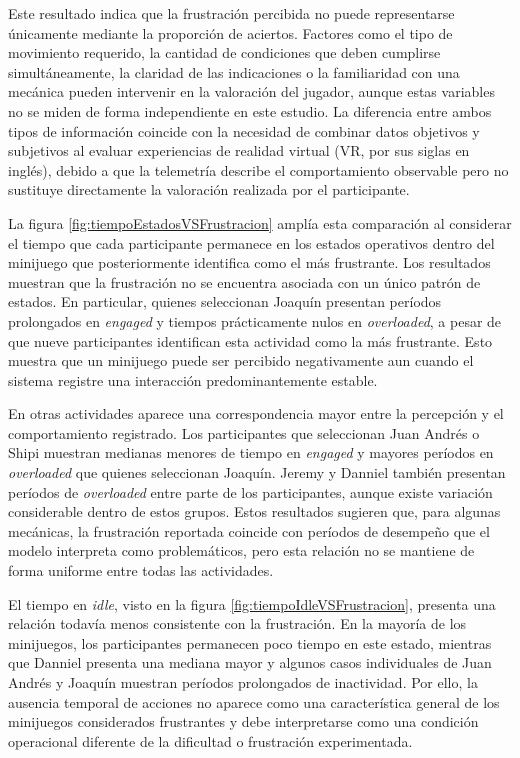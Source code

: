 Este resultado indica que la frustración percibida no puede 
representarse únicamente mediante la proporción de aciertos. Factores 
como el tipo de movimiento requerido, la cantidad de condiciones que 
deben cumplirse simultáneamente, la claridad de las indicaciones o la 
familiaridad con una mecánica pueden intervenir en la valoración del 
jugador, aunque estas variables no se miden de forma independiente en 
este estudio. La diferencia entre ambos tipos de información coincide 
con la necesidad de combinar datos objetivos y subjetivos al evaluar 
experiencias de realidad virtual (VR, por sus siglas en inglés), debido 
a que la telemetría describe el 
comportamiento observable pero no sustituye directamente la valoración 
realizada por el participante.

La figura \ref{fig:tiempoEstadosVSFrustracion} amplía esta comparación 
al considerar el tiempo que cada participante permanece en los estados 
operativos dentro del minijuego que posteriormente identifica como el 
más frustrante. Los resultados muestran que la frustración no se 
encuentra asociada con un único patrón de estados. En particular, quienes 
seleccionan Joaquín presentan períodos prolongados en \textit{engaged} 
y tiempos prácticamente nulos en \textit{overloaded}, a pesar de que 
nueve participantes identifican esta actividad como la más frustrante. 
Esto muestra que un minijuego puede ser percibido negativamente aun 
cuando el sistema registre una interacción predominantemente estable.

En otras actividades aparece una correspondencia mayor entre la 
percepción y el comportamiento registrado. Los participantes que 
seleccionan Juan Andrés o Shipi muestran medianas menores de tiempo en 
\textit{engaged} y mayores períodos en \textit{overloaded} que quienes 
seleccionan Joaquín. Jeremy y Danniel también presentan 
períodos de \textit{overloaded} entre parte de los participantes, aunque 
existe variación considerable dentro de estos grupos. Estos resultados 
sugieren que, para algunas mecánicas, la frustración reportada coincide 
con períodos de desempeño que el modelo interpreta como problemáticos, 
pero esta relación no se mantiene de forma uniforme entre todas las 
actividades.

El tiempo en \textit{idle}, visto en la figura \ref{fig:tiempoIdleVSFrustracion}, 
presenta una relación todavía menos 
consistente con la frustración. En la mayoría de los minijuegos, los 
participantes permanecen poco tiempo en este estado, mientras que 
Danniel presenta una mediana mayor y algunos casos individuales de 
Juan Andrés y Joaquín muestran períodos prolongados de inactividad. Por 
ello, la ausencia temporal de acciones no aparece como una 
característica general de los minijuegos considerados frustrantes y debe 
interpretarse como una condición operacional diferente de la dificultad o 
frustración experimentada.

